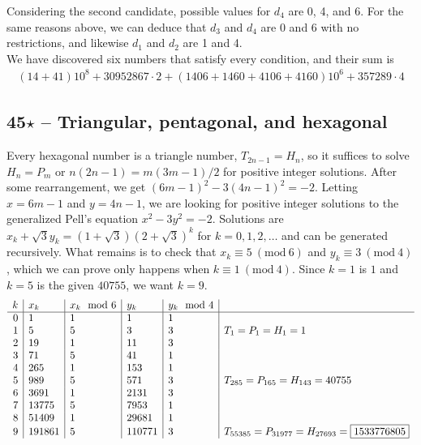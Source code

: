 \documentclass{article}
\newcommand{\Mod}[1]{\ (\mathrm{mod}\ #1)}
\begin{document}
Considering the second candidate, possible values for $d_4$ are 0, 4, and 6. For the same reasons above, we can deduce that $d_3$ and $d_4$ are 0 and 6 with no restrictions, and likewise $d_1$ and $d_2$ are 1 and 4. \\

We have discovered six numbers that satisfy every condition, and their sum is
\begin{align*}
	\boxed{ (14+41)10^8 + 30952867 \cdot 2 + (1406+1460+4106+4160)10^6 + 357289 \cdot 4 }
\end{align*}

\subsection*{45$\star$ -- Triangular, pentagonal, and hexagonal} 
Every hexagonal number is a triangle number, $T_{2n-1} = H_n$, so it suffices to solve $H_n = P_m$ or $n(2n-1) = m(3m-1)/2$ for positive integer solutions. 
After some rearrangement, we get $(6m-1)^2 - 3(4n-1)^2 = -2$. 
Letting $x = 6m-1$ and $y = 4n-1$, we are looking for positive integer solutions to the generalized Pell's equation $x^2 - 3y^2 = -2$.
Solutions are $x_k + \sqrt{3} y_k = (1+\sqrt{3})(2+\sqrt{3})^k$ for $k = 0, 1, 2, \dotsc$ and can be generated recursively.
What remains is to check that $x_k \equiv 5 \Mod{6}$ and $y_k \equiv 3 \Mod{4}$, which we can prove only happens when $k \equiv 1 \Mod{4}$. 
Since $k =1$ is $1$ and $k=5$ is the given $40755$, we want $k=9$.
\begin{align*}
	\begin{array}{r | l |l | l | l | l}
	k & x_k & x_k \mod 6 & y_k & y_k \mod 4 & \\ \hline
	0 & 1 & 1 & 1 & 1 \\
	1 & 5 & 5 & 3 & 3 & T_1 = P_1 = H_1 = 1\\
	2 & 19 & 1 & 11 & 3 \\
	3 & 71 & 5 & 41 & 1 \\
	4 & 265 & 1 & 153 & 1 \\
	5 & 989 & 5 & 571 & 3 & T_{285} = P_{165} = H_{143} = 40755 \\
	6 & 3691 & 1 & 2131 & 3 \\
	7 & 13775 & 5 & 7953 & 1 \\
	8 & 51409 & 1 & 29681 & 1 \\
	9 & 191861 & 5 & 110771 & 3 & T_{55385} = P_{31977} = H_{27693} = \boxed{1533776805}
	\end{array}
\end{align*}
\end{document}
